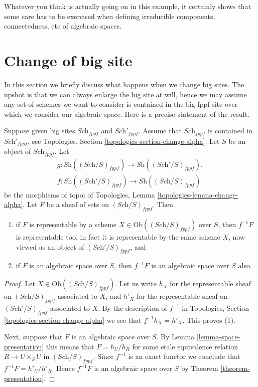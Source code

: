 \noindent
Whatever you think is actually going on in this example, it certainly
shows that some care has to be exercised when defining irreducible
components, connectedness, etc of algebraic spaces.






\section{Change of big site}
\label{section-change-big-site}

\noindent
In this section we briefly discuss what happens when we change big sites.
The upshot is that we can always enlarge the big site at will, hence we
may assume any set of schemes we want to consider is contained in the big
fppf site over which we consider our algebraic space. Here is a precise
statement of the result.

\begin{lemma}
\label{lemma-change-big-site}
Suppose given big sites $\textit{Sch}_{fppf}$ and $\textit{Sch}'_{fppf}$.
Assume that $\textit{Sch}_{fppf}$ is contained in $\textit{Sch}'_{fppf}$,
see Topologies, Section \ref{topologies-section-change-alpha}.
Let $S$ be an object of $\textit{Sch}_{fppf}$. Let
\begin{align*}
g : \textit{Sh}((\textit{Sch}/S)_{fppf})
\longrightarrow
\textit{Sh}((\textit{Sch}'/S)_{fppf}),\\
f : \textit{Sh}((\textit{Sch}'/S)_{fppf})
\longrightarrow
\textit{Sh}((\textit{Sch}/S)_{fppf})
\end{align*}
be the morphisms of topoi of
Topologies, Lemma \ref{topologies-lemma-change-alpha}.
Let $F$ be a sheaf of sets on $(\textit{Sch}/S)_{fppf}$. Then
\begin{enumerate}
\item if $F$ is representable by a scheme
$X \in \text{Ob}((\textit{Sch}/S)_{fppf})$ over $S$,
then $f^{-1}F$ is representable too, in fact it is representable by the
same scheme $X$, now viewed as an object of $(\textit{Sch}'/S)_{fppf}$, and
\item if $F$ is an algebraic space over $S$, then $f^{-1}F$ is an algebraic
space over $S$ also.
\end{enumerate}
\end{lemma}

\begin{proof}
Let $X \in \text{Ob}((\textit{Sch}/S)_{fppf})$. Let us write $h_X$ for the
representable sheaf on $(\textit{Sch}/S)_{fppf}$ associated to $X$, and
$h'_X$ for the representable sheaf on $(\textit{Sch}'/S)_{fppf}$ associated to
$X$. By the description of $f^{-1}$ in
Topologies, Section \ref{topologies-section-change-alpha}
we see that $f^{-1}h_X = h'_X$. This proves (1).

\medskip\noindent
Next, suppose that $F$
is an algebraic space over $S$. By Lemma \ref{lemma-space-presentation}
this means that $F = h_U/h_R$ for some etale equivalence relation
$R \to U \times_S U$ in $(\textit{Sch}/S)_{fppf}$. Since $f^{-1}$ is an
exact functor we conclude that $f^{-1}F = h'_U/h'_R$. Hence
$f^{-1}F$ is an algebraic space over $S$ by Theorem \ref{theorem-presentation}.
\end{proof}

